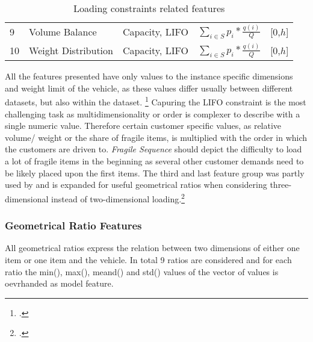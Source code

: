 \begin{table}[ht!]
\begin{tabular}{@{}P{0.08\textwidth}P{0.16\textwidth}P{0.26\textwidth}P{0.28\textwidth}@{}P{0.1\textwidth}@{}}
        9  & Volume Balance                                                                                  & Capacity, \gls{LIFO}   & $\displaystyle\sum_{i \in S}p_i * \frac{q(i)}{Q}$                         & [0,$h$] \\
        10 & Weight Distribution                                                                             & Capacity, \gls{LIFO}   & $\displaystyle\sum_{i \in S}p_i * \frac{q(i)}{Q}$                         & [0,$h$] \\
        \bottomrule
    \end{tabular}
    \caption{Loading constraints related features}
    \label{tab:loading_constraints_features}
\end{table}

All the features presented have only values to the instance specific dimensions and weight limit of the vehicle, as these values
differ usually between different datasets, but also within the \gendreauDataSetText dataset. \footcite[cf.][p. 346]{gendreau_tabu_2006}
Capuring the \gls{LIFO} constraint is the most challenging task as multidimensionality or order is complexer to describe with a single
numeric value. Therefore certain customer specific values, as relative volume/ weight or the share of fragile items, is multiplied
with the order in which the customers are driven to. \textit{Fragile Sequence} should depict the difficulty to load a lot of fragile items
in the beginning as several other customer demands need to be likely placed upon the first items. The third and last feature group
was partly used by \cite{zhang_learning-based_2022} and is expanded for useful geometrical ratios when considering three-dimensional
instead of two-dimensional loading.\footcite[cf.][p. 14]{zhang_learning-based_2022}

\subsubsection{Geometrical Ratio Features}

All geometrical ratios express the relation between two dimensions of either one item or one item and the vehicle. In total 9 ratios
are considered and for each ratio the min(), max(), meand() and std() values of the vector of values is oevrhanded as model feature.


